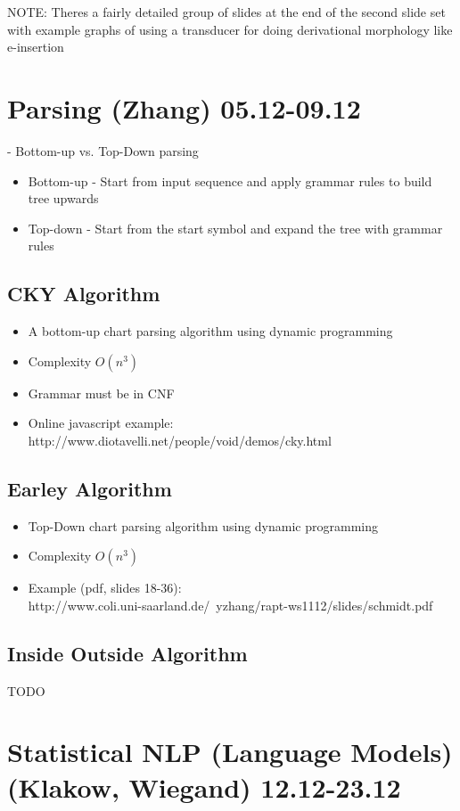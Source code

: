 \documentclass[11pt]{article}
\newenvironment{itemise}{
\begin{itemize}
  \setlength{\itemsep}{1pt}
  \setlength{\parskip}{0pt}
  \setlength{\parsep}{0pt}
}{\end{itemize}}
\begin{document}
NOTE: Theres a fairly detailed group of slides at the end of the second slide set with example graphs  of using a transducer for doing derivational morphology like e-insertion


\newpage\section{Parsing (Zhang) 05.12-09.12}

- Bottom-up vs. Top-Down parsing
\begin{itemise}
 \item Bottom-up - Start from input sequence and apply grammar rules to build tree upwards
 \item Top-down - Start from the start symbol and expand the tree with grammar rules
\end{itemise}
\subsection{ CKY Algorithm }
\begin{itemise}
 \item A bottom-up chart parsing algorithm using dynamic programming
 \item Complexity $O(n^3)$ 
 \item Grammar must be in CNF
 \item Online javascript example: http://www.diotavelli.net/people/void/demos/cky.html
\end{itemise}
\subsection{ Earley Algorithm }
\begin{itemise}
 \item Top-Down chart parsing algorithm using dynamic programming
 \item Complexity $O(n^3)$
 \item Example (pdf, slides 18-36): \\http://www.coli.uni-saarland.de/~yzhang/rapt-ws1112/slides/schmidt.pdf
\end{itemise}
\subsection { Inside Outside Algorithm }
TODO


\newpage\section{Statistical NLP (Language Models) (Klakow, Wiegand) 12.12-23.12}
\end{document}
